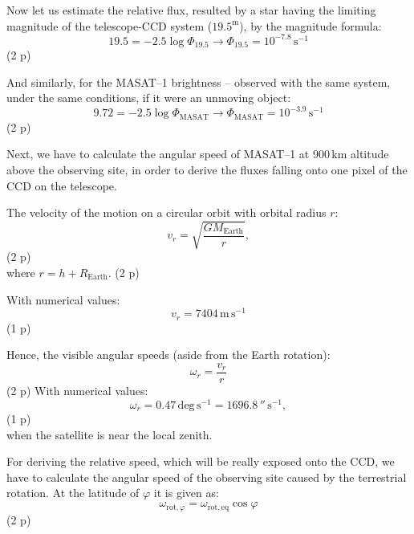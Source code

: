 \begin{description}
Now let us estimate the relative flux, resulted by a star having the limiting
magnitude of the telescope-CCD system ($19.5^{\mathrm{m}}$), by the magnitude
formula:
\begin{equation*}
19.5 = -2.5\log\Phi_{19.5} \rightarrow
  \Phi_{19.5} = 10^{-7.8}\,\mathrm{s^{-1}} \tag{14.6}
\end{equation*}
\hfill(2 p)

And similarly, for the MASAT--1 brightness -- observed with the same system,
under the same conditions, if it were an unmoving object:
\begin{equation*}
9.72 = -2.5\log\Phi_{\mathrm{MASAT}} \rightarrow
  \Phi_{\mathrm{MASAT}} = 10^{-3.9}\,\mathrm{s^{-1}} \tag{14.7}
\end{equation*}
\hfill(2 p)

Next, we have to calculate the angular speed of MASAT--1 at 900\,km altitude
above the observing site, in order to derive the fluxes falling onto one
pixel of the CCD on the telescope.

The velocity of the motion on a circular orbit with orbital radius $r$:
\begin{equation*}
v_r = \sqrt{\frac{GM_{\mathrm{Earth}}}{r}}, \tag{14.8}
\end{equation*}
\hfill(2 p)\\
where $r = h + R_{\mathrm{Earth}}$. \hfill(2 p)

With numerical values:
\[ v_r = 7404\,\mathrm{m\,s^{-1}} \]
\hfill(1 p)

Hence, the visible angular speeds (aside from the Earth rotation):
\begin{equation*}
\omega_r = \frac{v_r}{r} \tag{14.9}
\end{equation*}
\hfill(2 p)
With numerical values:
\[ \omega_r = 0.47\,\mathrm{deg\,s^{-1}} = 1696.8\,''\,\mathrm{s^{-1}}, \]
\hfill(1 p)\\
when the satellite is near the local zenith.

For deriving the relative speed, which will be really exposed onto the CCD,
we have to calculate the angular speed of the observing site caused by the
terrestrial rotation. At the latitude of $\varphi$ it is given as:
\begin{equation*}
\omega_{\mathrm{rot},\varphi} = \omega_{\mathrm{rot,eq}}\cos\varphi
\tag{14.10}
\end{equation*}
\hfill(2 p)


\end{description}
